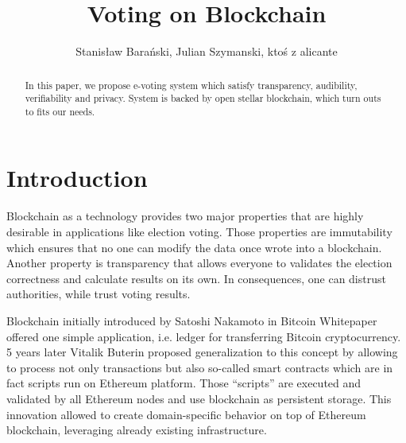 \documentclass[runningheads]{llncs}
\begin{document}
%
\title{Voting on Blockchain}
%
%
\author{Stanisław Barański, Julian Szymanski, ktoś z alicante}

%
%
\maketitle              %
%
\begin{abstract}
In this paper, we propose e-voting system which satisfy transparency, audibility, verifiability and privacy. System is backed by open stellar blockchain, which turn outs to fits our needs.


\end{abstract}


\section{Introduction}
Blockchain as a technology provides two major properties that are highly desirable in applications like election voting. Those properties are immutability which ensures that no one can modify the data once wrote into a blockchain. Another property is transparency that allows everyone to validates the election correctness and calculate results on its own. In consequences, one can distrust authorities, while trust voting results. 

Blockchain initially introduced by Satoshi Nakamoto in Bitcoin Whitepaper offered one simple application, i.e. ledger for transferring Bitcoin cryptocurrency. 5 years later Vitalik Buterin proposed generalization to this concept by allowing to process not only transactions but also so-called smart contracts which are in fact scripts run on Ethereum platform. Those “scripts” are executed and validated by all Ethereum nodes and use blockchain as persistent storage. This innovation allowed to create domain-specific behavior on top of Ethereum blockchain, leveraging already existing infrastructure.
\end{document}
